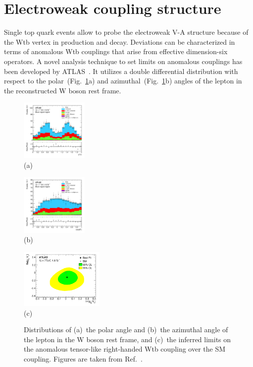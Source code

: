 \documentclass{PoS}
\begin{document}
\section{Electroweak coupling structure}
Single top quark events allow to probe the electroweak V-A structure because of the Wtb vertex in production and decay. Deviations can be characterized in terms of anomalous Wtb couplings that arise from effective dimension-six operators. A novel analysis technique to set limits on anomalous couplings has been developed by ATLAS~\cite{atlas-anomcoupl}. It utilizes a double differential distribution with respect to the polar~(Fig.~\ref{fig:angles}a) and azimuthal~(Fig.~\ref{fig:angles}b) angles of the lepton in the reconstructed W boson rest frame.

\begin{figure}[htbp]
\begin{center}
\parbox[t]{0.3\textwidth}{\centering\includegraphics[width=0.29\textwidth]{atlas_anomcoupl/phi.pdf}\\(a)}
\parbox[t]{0.3\textwidth}{\centering\includegraphics[width=0.29\textwidth]{atlas_anomcoupl/theta.pdf}\\(b)}
\parbox[t]{0.38\textwidth}{\centering\includegraphics[width=0.36\textwidth]{atlas_anomcoupl/limits.pdf}\\(c)}
\end{center}
\caption{\label{fig:angles}Distributions of (a)~the polar angle and (b)~the azimuthal angle of the lepton in the W boson rest frame, and (c)~the inferred limits on the anomalous tensor-like right-handed Wtb coupling over the SM coupling. Figures are taken from Ref.~\cite{atlas-anomcoupl}.}
\end{figure}
\end{document}
